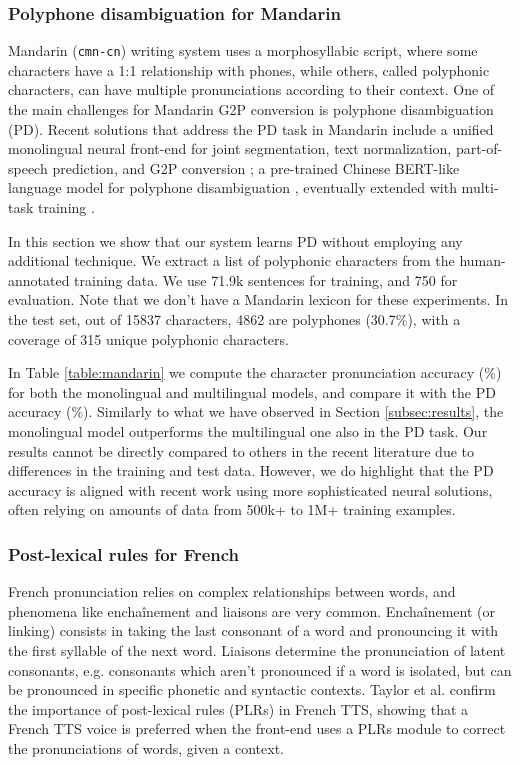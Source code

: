 \subsubsection{Polyphone disambiguation for Mandarin}
\label{subsubsec:mandarin}
Mandarin (\texttt{cmn-cn}) writing system uses a morphosyllabic script, where some characters have a 1:1 relationship with phones, while others, called polyphonic characters, can have multiple pronunciations according to their context. 
One of the main challenges for Mandarin G2P conversion is polyphone disambiguation (PD).
Recent solutions that address the PD task in Mandarin include a unified monolingual neural front-end for joint segmentation, text normalization, part-of-speech prediction, and G2P conversion \cite{unified_frontend20}; a pre-trained Chinese BERT-like \cite{bert} language model for polyphone disambiguation \cite{unified_frontend_bert20, zhang21, zhang22, g2pW_chen22}, eventually extended with multi-task training \cite{unified_frontend_bert20, g2pW_chen22}.

In this section we show that our system learns PD without employing any additional technique.
We extract a list of polyphonic characters from the human-annotated training data. We use \mytextapprox71.9k sentences for training, and 750 for evaluation. Note that we don't have a Mandarin lexicon for these experiments. In the test set, out of 15837 characters, 4862 are polyphones (30.7\%), with a coverage of 315 unique polyphonic characters. 

In Table \ref{table:mandarin} we compute the character pronunciation accuracy (\%) for both the monolingual and multilingual models, and compare it with the PD accuracy (\%). Similarly to what we have observed in Section \ref{subsec:results}, the monolingual model outperforms the multilingual one also in the PD task.
Our results cannot be directly compared to others in the recent literature due to differences in the training and test data. However, we do highlight that the PD accuracy is aligned with recent work using more sophisticated neural solutions, often relying on amounts of data from 500k+ \cite{unified_frontend_bert20} to 1M+ \cite{unified_frontend20, zhang22, g2pW_chen22} training examples.


\subsubsection{Post-lexical rules for French}
\label{subsubsec:french}
French pronunciation relies on complex relationships between words, and phenomena like enchaînement and liaisons are very common. Enchaînement (or linking) consists in taking the last consonant of a word and pronouncing it with the first syllable of the next word. Liaisons determine the pronunciation of latent consonants, e.g. consonants which aren't pronounced if a word is isolated, but can be pronounced in specific phonetic and syntactic contexts.
Taylor et al. \cite{liaisons21} confirm the importance of post-lexical rules (PLRs) in French TTS, showing that a French TTS voice is preferred when the front-end uses a PLRs module to correct the pronunciations of words, given a context. 

